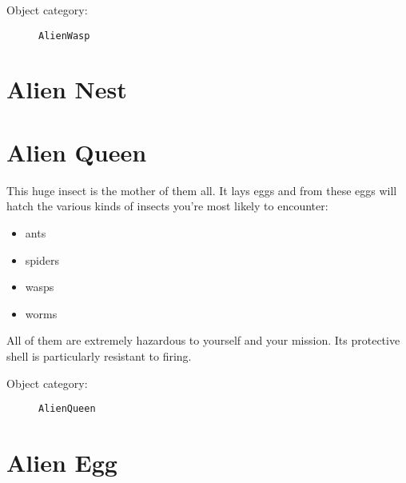 \begin{description}
    \item[Object category:] \texttt{AlienWasp}
\end{description}


\section{Alien Nest}



\section{Alien Queen}

This huge insect is the mother of them all. It lays eggs and from these eggs will hatch the various kinds of insects you're most likely to encounter:
\begin{itemize}
    \item ants
    \item spiders
    \item wasps
    \item worms
\end{itemize}
All of them are extremely hazardous to yourself and your mission.
Its protective shell is particularly resistant to firing.

\begin{description}
    \item[Object category:] \texttt{AlienQueen}
\end{description}


\section{Alien Egg}

